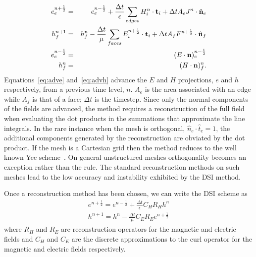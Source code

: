 \documentclass[12pt]{article}
\begin{document}
\begin{eqnarray}
e^{n+\frac{1}{2}}_e&=&e^{n-\frac{1}{2}}_e + \frac{\Delta t}{\epsilon}\sum_{edges} {H^n_i\cdot{\bf t}_i} + \Delta tA_e J^n\cdot{\hat {\bf n}}_e\label{eq:adve}\\
h^{n+1}_f &=&h^{n}_f-\frac{\Delta t}{\mu}\sum_{faces} {E^{n+\frac{1}{2}}_i\cdot{\bf t}_i} + \Delta tA_f F^{n+\frac{1}{2}}\cdot{\hat {\bf n}}_f\label{eq:advh}\\
e^{n-\frac{1}{2}}_e &=& (E\cdot{\bf n})^{n-\frac{1}{2}}_e\\
h^n_f &=& (H\cdot{\bf n})^{n}_f.
\end{eqnarray} 
Equations~\ref{eq:adve} and~\ref{eq:advh} advance the $E$ and $H$
projections, $e$ and $h$ respectively, from a previous time level,
$n$.  $A_e$ is the area associated with an edge while $A_f$ is that of
a face; $\Delta t$ is the timestep.  Since only the normal components
of the fields are advanced, the method requires a reconstruction of the
full field when evaluating the dot products in the summations that
approximate the line integrals.  In the rare instance when the mesh is
orthogonal, ${\hat n}_e\cdot{\hat t}_e = 1$, the additional components
generated by the reconstruction are obviated by the dot product.  If
the mesh is a Cartesian grid then the method reduces to the well known
Yee scheme~\cite{yee}.  On general unstructured meshes orthogonality becomes an
exception rather than the rule.  The standard reconstruction methods
on such meshes lead to the low accuracy and instability exhibited by
the DSI method.

Once a reconstruction method has been chosen, we can write the DSI scheme as
\begin{eqnarray}
e^{n+\frac{1}{2}} = e^{n-\frac{1}{2}} + \frac{\Delta t}{\epsilon}C_H R_H h^n\label{eq:eop}\\
h^{n+1} = h^n - \frac{\Delta t}{\mu}C_E R_E e^{n+\frac{1}{2}}\label{eq:hop}
\end{eqnarray}
where $R_H$ and $R_E$ are reconstruction operators for the magnetic and electric fields
and $C_H$ and $C_E$ are the discrete approximations to the curl operator for the
magnetic and electric fields respectively.   
\end{document}
